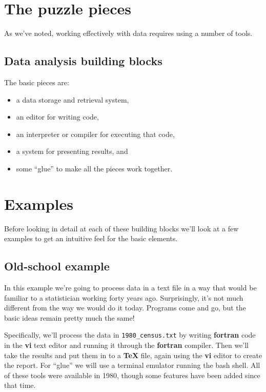 \documentclass[]{book}
\providecommand{\tightlist}{%
  \setlength{\itemsep}{0pt}\setlength{\parskip}{0pt}}
\begin{document}
\section{The puzzle pieces}\label{the-puzzle-pieces}

As we've noted, working effectively with data requires using a number of
tools.

\subsection{Data analysis building
blocks}\label{data-analysis-building-blocks}

The basic pieces are:

\begin{itemize}
\tightlist
\item
  a data storage and retrieval system,
\item
  an editor for writing code,
\item
  an interpreter or compiler for executing that code,
\item
  a system for presenting results, and
\item
  some ``glue'' to make all the pieces work together.
\end{itemize}

\section{Examples}\label{examples}

Before looking in detail at each of these building blocks we'll look at
a few examples to get an intuitive feel for the basic elements.

\subsection{Old-school example}\label{old-school-example}

In this example we're going to process data in a text file in a way that
would be familiar to a statistician working forty years ago.
Surprisingly, it's not much different from the way we would do it today.
Programs come and go, but the basic ideas remain pretty much the same!

Specifically, we'll process the data in \texttt{1980\_census.txt} by
writing \textbf{fortran} code in the \textbf{vi} text editor and running
it through the \textbf{fortran} compiler. Then we'll take the results
and put them in to a \textbf{TeX} file, again using the \textbf{vi}
editor to create the report. For ``glue'' we will use a terminal
emulator running the bash shell. All of these tools were available in
1980, though some features have been added since that time.
\end{document}
